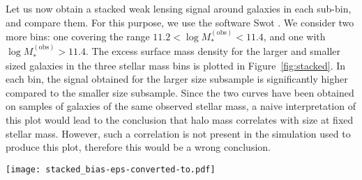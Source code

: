 \documentclass[usenatbib]{mnras}
\def\mobs{M_*^{\mathrm{(obs)}}}
\def\Fref#1{Figure~\ref{#1}\xspace}
\begin{document}
Let us now obtain a stacked weak lensing signal around galaxies in each sub-bin, and compare them. For this purpose, we use the software {\sc Swot} \citep{Cou++12, SWOT17}. 
We consider two more bins: one covering the range $11.2 < \log{\mobs} < 11.4$, and one with $\log{\mobs} > 11.4$.
The excess surface mass density for the larger and smaller sized galaxies in the three stellar mass bins is plotted in \Fref{fig:stacked}.
In each bin, the signal obtained for the larger size subsample is significantly higher compared to the smaller size subsample.
Since the two curves have been obtained on samples of galaxies of the same observed stellar mass, a naive interpretation of this plot would lead to the conclusion that halo mass correlates with size at fixed stellar mass.
However, such a correlation is not present in the simulation used to produce this plot, therefore this would be a wrong conclusion.
%
\begin{figure*}
 \texttt{[image: stacked\_bias-eps-converted-to.pdf]}
 \caption{Excess surface mass density in different radial bins around two samples of lens galaxies from mock E, selected by having their observed stellar mass in three different bins (with mass range indicated in each panel), and split according to their position with respect to the mean mass-size relation.
The signal is obtained by stacking weak lensing measurements, using the software {\sc Swot} \citep{Cou++12, SWOT17}. 
In each stellar mass bin, the larger size sample appears to have a higher excess surface mass density compared to the smaller size sample. This is just the result of the two subsamples having different values of their true stellar mass.
\label{fig:stacked}}
\end{figure*}
%
\end{document}
